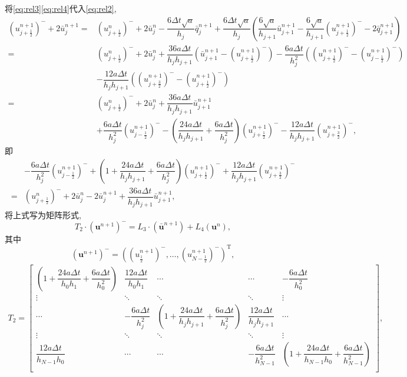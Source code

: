\documentclass[a4paper, 11pt]{ctexart}
\numberwithin{equation}{section}
\numberwithin{figure}{section}
\newcommand\bu{\bm{u}}
\begin{document}
将\eqref{eq:rel3}\eqref{eq:rel4}代入\eqref{eq:rel2},
\begin{align}
  (u^{n+1}_{j+\frac12})^{-}+2\bar{u}^{n+1}_j
  =&(u^{n}_{j+\frac12})^{-}+2\bar{u}^n_j
  -\dfrac{6\Delta t\sqrt{a}}{h_j}\bar{q}^{n+1}_j
  +\dfrac{6\Delta t\sqrt{a}}{h_j}
  \left(\dfrac{6\sqrt{a}}{h_{j+1}}\bar{u}^{n+1}_{j+1}
    -\dfrac{6\sqrt{a}}{h_{j+1}}({u}^{n+1}_{j+\frac12})^{-}
  -2\bar{q}^{n+1}_{j+1}\right) \nonumber \\
  =&(u^{n}_{j+\frac12})^{-}+2\bar{u}^n_j
  +\dfrac{36a\Delta t}{h_jh_{j+1}}
  \left( \bar{u}^{n+1}_{j+1} -({u}^{n+1}_{j+\frac12})^{-}\right)
  -\dfrac{6a\Delta t}{h_j^2}
  \left( (u^{n+1}_{j+\frac12})^{-}-(u^{n+1}_{j-\frac12})^{-} \right)
  \nonumber \\
  &-\dfrac{12a\Delta t}{h_jh_{j+1}}
  \left( (u^{n+1}_{j+\frac32})^{-}-(u^{n+1}_{j+\frac12})^{-} \right)
  \nonumber \\
  =&(u^{n}_{j+\frac12})^{-}+2\bar{u}^n_j
  +\dfrac{36a\Delta t}{h_jh_{j+1}} \bar{u}^{n+1}_{j+1} \nonumber \\
  &+\dfrac{6a\Delta t}{h_j^2}({u}^{n+1}_{j-\frac12})^{-}
  -\left( \dfrac{24a\Delta t}{h_jh_{j+1}}+\dfrac{6a\Delta t}{h_j^2}\right)({u}^{n+1}_{j+\frac12})^{-}
  -\dfrac{12a\Delta t}{h_jh_{j+1}}({u}^{n+1}_{j+\frac32})^{-}, \nonumber
\end{align}
即
\begin{align}
  &-\dfrac{6a\Delta t}{h_j^2}({u}^{n+1}_{j-\frac12})^{-}
  +\left( 1+\dfrac{24a\Delta t}{h_jh_{j+1}}+\dfrac{6a\Delta t}{h_j^2}\right)({u}^{n+1}_{j+\frac12})^{-}
  +\dfrac{12a\Delta t}{h_jh_{j+1}}({u}^{n+1}_{j+\frac32})^{-} \nonumber \\
  =&(u^{n}_{j+\frac12})^{-}+2\bar{u}^n_j
  -2\bar{u}^{n+1}_j +\dfrac{36a\Delta t}{h_jh_{j+1}} \bar{u}^{n+1}_{j+1},
  \label{eq:flux-av2}
\end{align}
将上式写为矩阵形式,
\begin{equation}
  T_2\cdot(\bu^{n+1})^{-}=L_3\cdot(\bar{\bu}^{n+1})+L_4(\bu^n),
\end{equation}
其中
\begin{equation}
  (\bu^{n+1})^{-}=((u^{n+1}_{\frac12})^{-},\dots,(u^{n+1}_{N-\frac12})^{-})^\mathrm{T},
\end{equation}
\begin{align}
  T_2=
  \begin{bmatrix}
  \left( 1+\dfrac{24a\Delta t}{h_0h_{1}}+\dfrac{6a\Delta t}{h_0^2}\right)
  & \dfrac{12a\Delta t}{h_0h_{1}} & \cdots & \cdots & -\dfrac{6a\Delta t}{h_0^2} \\
    \vdots & \ddots  & \ddots  & \ddots  & \vdots \\
  \cdots &-\dfrac{6a\Delta t}{h_j^2} & \left( 1+\dfrac{24a\Delta t}{h_jh_{j+1}}+\dfrac{6a\Delta t}{h_j^2}\right)
  & \dfrac{12a\Delta t}{h_jh_{j+1}} & \cdots \\
    \vdots & \ddots  & \ddots  & \ddots  & \vdots \\
    \dfrac{12a\Delta t}{h_{N-1}h_{0}} & \cdots & \cdots &-\dfrac{6a\Delta
    t}{h_{N-1}^2} & \left( 1+\dfrac{24a\Delta t}{h_{N-1}h_{0}}+\dfrac{6a\Delta
    t}{h_{N-1}^2}\right)
   \\
  \end{bmatrix},
\end{align}
\end{document}
